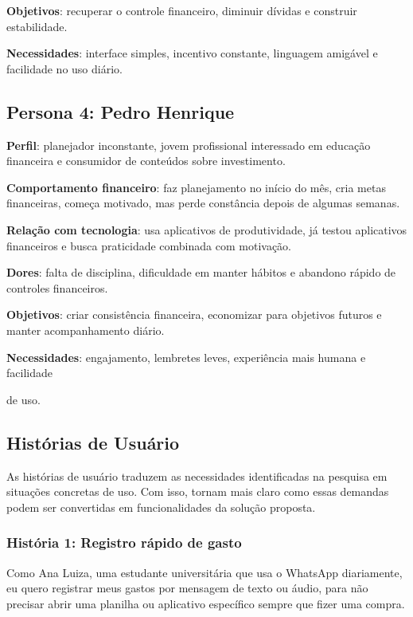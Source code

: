 \textbf{Objetivos}: recuperar o controle financeiro, diminuir dívidas e construir estabilidade.

\textbf{Necessidades}: interface simples, incentivo constante, linguagem amigável e facilidade no uso diário.

\subsection{Persona 4: Pedro Henrique}

\textbf{Perfil}: planejador inconstante, jovem profissional interessado em educação financeira e consumidor de conteúdos sobre investimento.

\textbf{Comportamento financeiro}: faz planejamento no início do mês, cria metas financeiras, começa motivado, mas perde constância depois de algumas semanas.

\textbf{Relação com tecnologia}: usa aplicativos de produtividade, já testou aplicativos financeiros e busca praticidade combinada com motivação.

\textbf{Dores}: falta de disciplina, dificuldade em manter hábitos e abandono rápido de controles financeiros.

\textbf{Objetivos}: criar consistência financeira, economizar para objetivos futuros e manter acompanhamento diário.

\textbf{Necessidades}: engajamento, lembretes leves, experiência mais humana e facilidade

de uso.

\subsection{Histórias de Usuário}

As histórias de usuário traduzem as necessidades identificadas na pesquisa em situações concretas de uso. Com isso, tornam mais claro como essas demandas podem ser convertidas em funcionalidades da solução proposta.

\subsubsection{História 1: Registro rápido de gasto}

Como Ana Luiza, uma estudante universitária que usa o WhatsApp diariamente, eu quero registrar meus gastos por mensagem de texto ou áudio, para não precisar abrir uma planilha ou aplicativo específico sempre que fizer uma compra.

